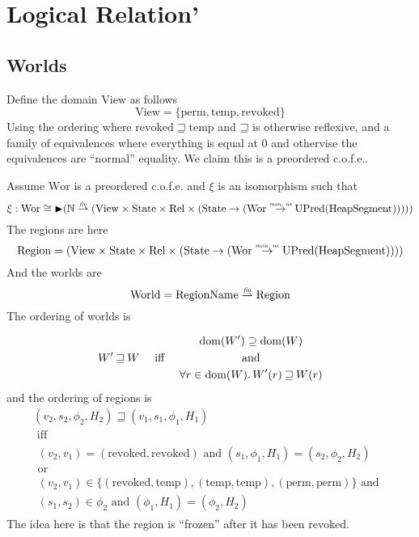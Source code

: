 \documentclass{article}
\newcommand{\finparfun}{\stackrel{\textit{\tiny{fin}}}{\rightharpoonup}}
\newcommand{\monnefun}{\stackrel{\textit{\tiny{mon, ne}}}{\rightarrow}}
\newcommand{\fun}{\rightarrow}
\DeclareMathOperator{\dom}{dom}
\newcommand{\blater}{\mathop{\blacktriangleright}}
\newcommand{\cofe}{c.o.f.e.}
\newcommand{\future}{\mathbin{\sqsupseteq}}
\newcommand{\plaindom}[1]{\mathrm{#1}}
\newcommand{\HeapSegments}{\plaindom{HeapSegment}}
\newcommand{\nats}{\mathbb{N}}
\newcommand{\Rel}{\plaindom{Rel}}
\newcommand{\States}{\plaindom{State}}
\newcommand{\RegionNames}{\plaindom{RegionName}}
\newcommand{\Regions}{\plaindom{Region}}
\newcommand{\Worlds}{\plaindom{World}}
\newcommand{\Wor}{\plaindom{Wor}}
\newcommand{\UPred}[1]{\plaindom{UPred}(#1)}
\newcommand{\Views}{\plaindom{View}}
\newcommand{\plainview}[1]{\mathrm{#1}}
\newcommand{\perma}{\plainview{perm}}
\newcommand{\temp}{\plainview{temp}}
\newcommand{\revoked}{\plainview{revoked}}
\begin{document}
\section{Logical Relation'}
\subsection{Worlds}
Define the domain $\Views$ as follows
\[
  \Views = \{\perma,\temp,\revoked\}
\]
Using the ordering where $\revoked \future \temp$ and $\future$ is otherwise reflexive, and a family of equivalences where everything is equal at 0 and othervise the equivalences are ``normal'' equality. We claim this is a preordered \cofe{}. %

Assume $\Wor$ is a preordered \cofe{} and $\xi$ is an isomorphism such that
\[
  \xi : \Wor \cong \blater (\nats \finparfun (\Views \times \States \times \Rel \times (\States \fun (\Wor \monnefun \UPred{\HeapSegments}))))
\]
The regions are here
\[
  \Regions = (\Views \times \States \times \Rel \times (\States \fun (\Wor \monnefun \UPred{\HeapSegments})))
\]
And the worlds are
\[
  \Worlds = \RegionNames \finparfun \Regions
\]
The ordering of worlds is

 \begin{align*}
 W' \future W & & \text{ iff } & &
   \begin{gathered}
     \dom(W') \supseteq \dom(W)\\ 
     \text{ and } \\
     \forall r \in \dom(W) \ldotp W'(r) \future W(r)
   \end{gathered}
 \end{align*}
and the ordering of regions is
\begin{gather*}
  (v_2,s_2,\phi_2,H_2) \future (v_1,s_1,\phi_1,H_1) \\
  \text{ iff } \\ 
    \begin{gathered}
      (v_2,v_1) = (\revoked,\revoked) \text{ and } (s_1,\phi_1,H_1) = (s_2,\phi_2,H_2) \\
      \text{or} \\
      (v_2,v_1) \in \{(\revoked,\temp), (\temp,\temp), (\perma,\perma) \} \text{ and } \\
      (s_1,s_2) \in \phi_2 \text{ and } (\phi_1,H_1) = (\phi_2,H_2)
    \end{gathered} 
\end{gather*}
The idea here is that the region is ``frozen'' after it has been revoked.
\end{document}
